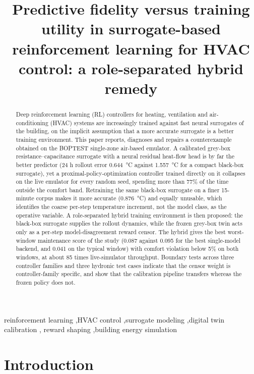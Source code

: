 \documentclass[5p]{elsarticle}
\begin{document}
\begin{frontmatter}

\title{Predictive fidelity versus training utility in surrogate-based reinforcement
learning for HVAC control: a role-separated hybrid remedy}

\begin{abstract}
Deep reinforcement learning (RL) controllers for heating, ventilation and air-conditioning (HVAC)
systems are increasingly trained against fast neural surrogates of the building, on the implicit
assumption that a more accurate surrogate is a better training environment. This paper reports,
diagnoses and repairs a counterexample obtained on the BOPTEST single-zone air-based emulator. A
calibrated grey-box resistance--capacitance surrogate with a neural residual heat-flow head is by
far the better predictor (24 h rollout error \SI{0.644}{\celsius} against \SI{1.557}{\celsius} for a
compact black-box surrogate), yet a proximal-policy-optimization controller trained directly on it
collapses on the live emulator for every random seed, spending more than 77\% of the time outside
the comfort band. Retraining the same black-box surrogate on a finer 15-minute corpus makes it more
accurate (\SI{0.876}{\celsius}) and equally unusable, which identifies the coarse per-step
temperature increment, not the model class, as the operative variable. A role-separated hybrid
training environment is then proposed: the black-box surrogate supplies the rollout dynamics, while
the frozen grey-box twin acts only as a per-step model-disagreement reward censor. The hybrid gives
the best worst-window maintenance score of the study (0.087 against 0.095 for the best single-model
backend, and 0.041 on the typical window) with comfort violation below 5\% on both windows, at about
85 times live-simulator throughput. Boundary tests across three controller families and three
hydronic test cases indicate that the censor weight is controller-family specific, and show that the
calibration pipeline transfers whereas the frozen policy does not.
\end{abstract}

\begin{keyword}
reinforcement learning \sep HVAC control \sep surrogate modeling \sep digital twin calibration \sep
reward shaping \sep building energy simulation
\end{keyword}

\end{frontmatter}

\section{Introduction}
\end{document}
